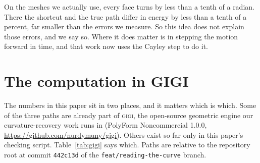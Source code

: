 \documentclass[11pt]{article}
\begin{document}
\begin{plain}
On the meshes we actually use, every face turns by less than a tenth of a radian. There the
shortcut and the true path differ in energy by less than a tenth of a percent, far smaller
than the errors we measure. So this idea does not explain those errors, and we say so. Where
it does matter is in stepping the motion forward in time, and that work now uses the Cayley
step to do it.
\end{plain}

\section{The computation in GIGI}\label{sec:gigi}

The numbers in this paper sit in two places, and it matters which is which. Some of the
three paths are already part of \textsc{gigi}, the open-source geometric engine our
curvature-recovery work runs in (PolyForm Noncommercial 1.0.0,
\url{https://github.com/nurdymuny/gigi}). Others exist so far only in this paper's
checking script. Table~\ref{tab:gigi} says which. Paths are relative to the repository
root at commit \texttt{442c13d} of the \texttt{feat/reading-the-curve} branch.
\end{document}
